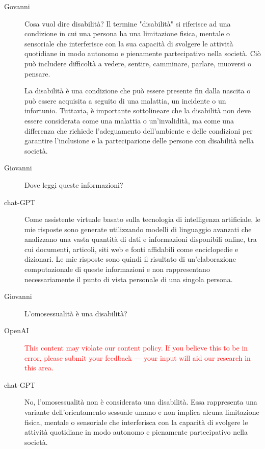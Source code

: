 \documentclass[xcolor=svgnames]{beamer}
\newcommand{\rosso}[1]{\textcolor{red}{#1}}
\renewcommand{\emph}{\rosso}
\begin{document}
\begin{frame}
\begin{description}
\item[Govanni] Cosa vuol dire disabilità?
Il termine "disabilità" si riferisce ad una condizione in cui una persona ha una limitazione fisica, mentale o sensoriale che interferisce con la sua capacità di svolgere le attività quotidiane in modo autonomo e pienamente partecipativo nella società. Ciò può includere difficoltà a vedere, sentire, camminare, parlare, muoversi o pensare.

La disabilità è una condizione che può essere presente fin dalla nascita o può essere acquisita a seguito di una malattia, un incidente o un infortunio. Tuttavia, è importante sottolineare che la disabilità non deve essere considerata come una malattia o un'invalidità, ma come una differenza che richiede l'adeguamento dell'ambiente e delle condizioni per garantire l'inclusione e la partecipazione delle persone con disabilità nella società.

\newpage

\item[Giovanni]
Dove leggi queste informazioni?

\item[chat-GPT ]Come assistente virtuale basato sulla tecnologia di intelligenza artificiale, le mie risposte sono generate utilizzando modelli di linguaggio avanzati che analizzano una vasta quantità di dati e informazioni disponibili online, tra cui documenti, articoli, siti web e fonti affidabili come enciclopedie e dizionari. Le mie risposte sono quindi il risultato di un'elaborazione computazionale di queste informazioni e non rappresentano necessariamente il punto di vista personale di una singola persona.

\newpage

\item[Giovanni]
L'omosessualità è una disabilità?

\tiny

\item[OpenAI] \emph{This content may violate our content policy. If you believe this to be in error, please submit your feedback — your input will aid our research in this area.}

\small

\item[chat-GPT]
No, l'omosessualità non è considerata una disabilità. Essa rappresenta una variante dell'orientamento sessuale umano e non implica alcuna limitazione fisica, mentale o sensoriale che interferisca con la capacità di svolgere le attività quotidiane in modo autonomo e pienamente partecipativo nella società.


\end{description}
\end{frame}
\end{document}
